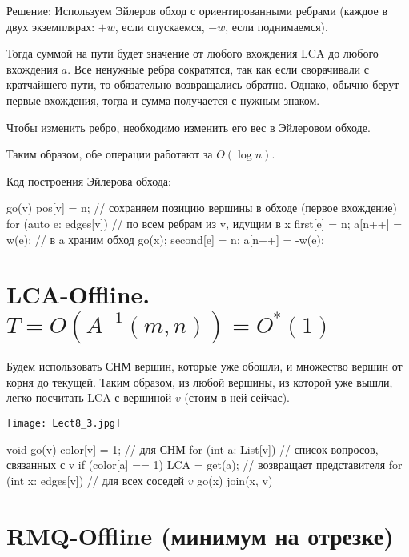 Решение:
Используем Эйлеров обход с ориентированными ребрами (каждое в двух экземплярах: $+w$, если спускаемся, $-w$, если поднимаемся).

Тогда суммой на пути будет значение от любого вхождения LCA до любого вхождения $a$.
Все ненужные ребра сократятся, так как если сворачивали с кратчайшего пути, то обязательно возвращались обратно.
Однако, обычно берут первые вхождения, тогда и сумма получается с нужным знаком.

Чтобы изменить ребро, необходимо изменить его вес в Эйлеровом обходе.

Таким образом, обе операции работают за $O(\log n)$.

Код построения Эйлерова обхода:

\begin{cppcode}
go(v) {
	pos[v] = n; // сохраняем позицию вершины в обходе (первое вхождение)
	for (auto e: edges[v]) { // по всем ребрам из v, идущим в x
		first[e] = n;
		a[n++] = w(e); // в a храним обход
		go(x);
		second[e] = n;
		a[n++] = -w(e);
	}
}
\end{cppcode}

\section{LCA-Offline. \texorpdfstring{$T = O\left(A^{-1}(m, n)\right) = O^*\left(1\right)$}{T = O(A^-1(m, n)) = O*(1)}}

Будем использовать СНМ вершин, которые уже обошли, и множество вершин от корня до текущей.
Таким образом, из любой вершины, из которой уже вышли, легко посчитать LCA с вершиной $v$ (стоим в ней сейчас).

\begin{center}
	\texttt{[image: Lect8\_3.jpg]}
\end{center}

\begin{cppcode}
void go(v) {
	color[v] = 1; // для СНМ
	for (int a: List[v]) // список вопросов, связанных с v
		if (color[a] == 1)
			LCA = get(a); // возвращает представителя
	for (int x: edges[v]) { // для всех соседей $v$
		go(x)
		join(x, v)
	}
}
\end{cppcode}

\section{RMQ-Offline (минимум на отрезке)}

